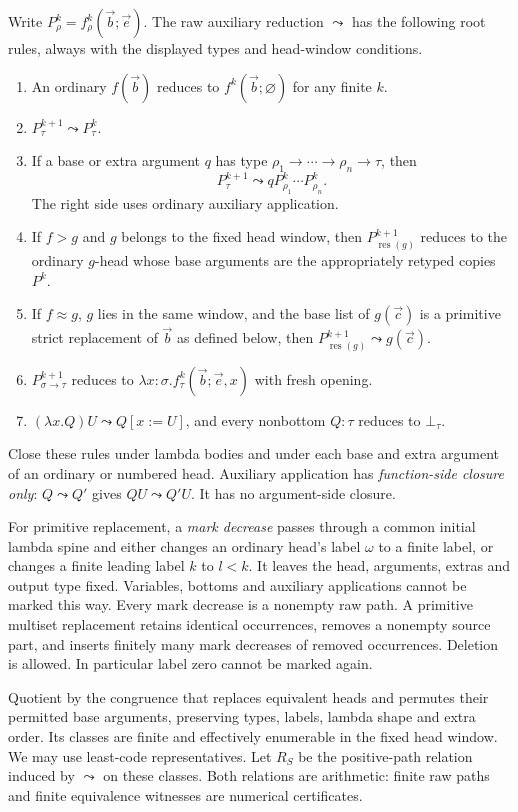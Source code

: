 Write $P^k_\rho=f^k_\rho(\vec b;\vec e)$. The raw auxiliary reduction
$\leadsto$ has the following root rules, always with the displayed
types and head-window conditions.
\begin{enumerate}
\item An ordinary $f(\vec b)$ reduces to $f^k(\vec b;\varnothing)$
for any finite $k$.
\item $P^{k+1}_\tau\leadsto P^k_\tau$.
\item If a base or extra argument $q$ has type
$\rho_1\to\cdots\to\rho_n\to\tau$, then
\[
 P^{k+1}_\tau\leadsto qP^k_{\rho_1}\cdots P^k_{\rho_n}.
\]
The right side uses ordinary auxiliary application.
\item If $f>g$ and $g$ belongs to the fixed head window, then
$P^{k+1}_{\operatorname{res}(g)}$ reduces to the ordinary $g$-head
whose base arguments are the appropriately retyped copies $P^k$.
\item If $f\approx g$, $g$ lies in the same window, and the base list
of $g(\vec c)$ is a primitive strict replacement of $\vec b$ as defined
below, then $P^{k+1}_{\operatorname{res}(g)}\leadsto g(\vec c)$.
\item $P^{k+1}_{\sigma\to\tau}$ reduces to
$\lambda x:\sigma.f^k_\tau(\vec b;\vec e,x)$ with fresh opening.
\item $(\lambda x.Q)U\leadsto Q[x:=U]$, and every nonbottom $Q:\tau$
reduces to $\bot_\tau$.
\end{enumerate}
Close these rules under lambda bodies and under each base and extra
argument of an ordinary or numbered head. Auxiliary application has
\emph{function-side closure only}: $Q\leadsto Q'$ gives
$QU\leadsto Q'U$. It has no argument-side closure.

For primitive replacement, a \emph{mark decrease} passes through a
common initial lambda spine and either changes an ordinary head's label
$\omega$ to a finite label, or changes a finite leading label $k$ to
$l<k$. It leaves the head, arguments, extras and output type fixed.
Variables, bottoms and auxiliary applications cannot be marked this way.
Every mark decrease is a nonempty raw path. A primitive multiset
replacement retains identical occurrences, removes a nonempty source
part, and inserts finitely many mark decreases of removed occurrences.
Deletion is allowed. In particular label zero cannot be marked again.

Quotient by the congruence that replaces equivalent heads and permutes
their permitted base arguments, preserving types, labels, lambda shape
and extra order. Its classes are finite and effectively enumerable in
the fixed head window. We may use least-code representatives. Let
$R_S$ be the positive-path relation induced by $\leadsto$ on these
classes. Both relations are arithmetic: finite raw paths and finite
equivalence witnesses are numerical certificates.


